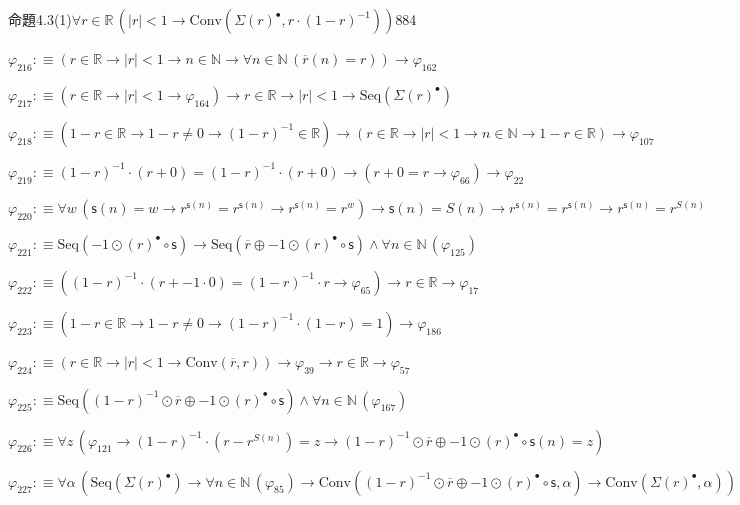 \begin{fullproof}{命題4.3(1)}{$\forall r \in \mathbb{R}\,(\lvert r \rvert < 1 \to \mathrm{Conv}(\Sigma {(r)^{\bullet}},r \cdot (1 - r)^{-1}))$}{884}
\begin{abbrevlist}
\item $\varphi_{216} :\equiv (r \in \mathbb{R} \to \lvert r \rvert < 1 \to n \in \mathbb{N} \to \forall n \in \mathbb{N}\,(\overline{r}(n) = r)) \to \varphi_{162}$
\item $\varphi_{217} :\equiv (r \in \mathbb{R} \to \lvert r \rvert < 1 \to \varphi_{164}) \to r \in \mathbb{R} \to \lvert r \rvert < 1 \to \mathrm{Seq}(\Sigma {(r)^{\bullet}})$
\item $\varphi_{218} :\equiv (1 - r \in \mathbb{R} \to 1 - r \neq 0 \to (1 - r)^{-1} \in \mathbb{R}) \to (r \in \mathbb{R} \to \lvert r \rvert < 1 \to n \in \mathbb{N} \to 1 - r \in \mathbb{R}) \to \varphi_{107}$
\item $\varphi_{219} :\equiv (1 - r)^{-1} \cdot (r + 0) = (1 - r)^{-1} \cdot (r + 0) \to (r + 0 = r \to \varphi_{66}) \to \varphi_{22}$
\item $\varphi_{220} :\equiv \forall w\,(\mathsf{s}(n) = w \to {{r}^{\mathsf{s}(n)}} = {{r}^{\mathsf{s}(n)}} \to {{r}^{\mathsf{s}(n)}} = {{r}^{w}}) \to \mathsf{s}(n) = S(n) \to {{r}^{\mathsf{s}(n)}} = {{r}^{\mathsf{s}(n)}} \to {{r}^{\mathsf{s}(n)}} = {{r}^{S(n)}}$
\item $\varphi_{221} :\equiv \mathrm{Seq}(-1 \odot {(r)^{\bullet}} \circ \mathsf{s}) \to \mathrm{Seq}(\overline{r} \oplus -1 \odot {(r)^{\bullet}} \circ \mathsf{s}) \land \forall n \in \mathbb{N}\,(\varphi_{125})$
\item $\varphi_{222} :\equiv ((1 - r)^{-1} \cdot (r + -1 \cdot 0) = (1 - r)^{-1} \cdot r \to \varphi_{65}) \to r \in \mathbb{R} \to \varphi_{17}$
\item $\varphi_{223} :\equiv (1 - r \in \mathbb{R} \to 1 - r \neq 0 \to (1 - r)^{-1} \cdot (1 - r) = 1) \to \varphi_{186}$
\item $\varphi_{224} :\equiv (r \in \mathbb{R} \to \lvert r \rvert < 1 \to \mathrm{Conv}(\overline{r},r)) \to \varphi_{39} \to r \in \mathbb{R} \to \varphi_{57}$
\item $\varphi_{225} :\equiv \mathrm{Seq}((1 - r)^{-1} \odot \overline{r} \oplus -1 \odot {(r)^{\bullet}} \circ \mathsf{s}) \land \forall n \in \mathbb{N}\,(\varphi_{167})$
\item $\varphi_{226} :\equiv \forall z\,(\varphi_{121} \to (1 - r)^{-1} \cdot (r - {{r}^{S(n)}}) = z \to (1 - r)^{-1} \odot \overline{r} \oplus -1 \odot {(r)^{\bullet}} \circ \mathsf{s}(n) = z)$
\item $\varphi_{227} :\equiv \forall \alpha\,(\mathrm{Seq}(\Sigma {(r)^{\bullet}}) \to \forall n \in \mathbb{N}\,(\varphi_{85}) \to \mathrm{Conv}((1 - r)^{-1} \odot \overline{r} \oplus -1 \odot {(r)^{\bullet}} \circ \mathsf{s},\alpha) \to \mathrm{Conv}(\Sigma {(r)^{\bullet}},\alpha))$

\end{abbrevlist}
\end{fullproof}
